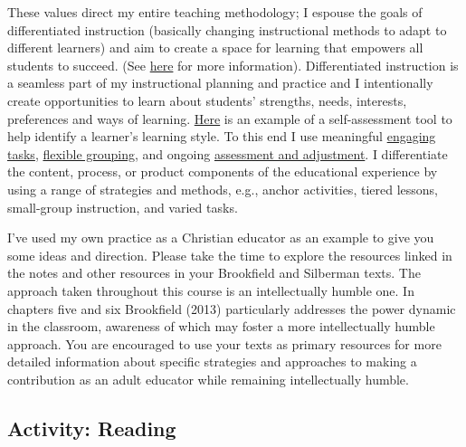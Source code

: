 \documentclass[
]{book}
\begin{document}
These values direct my entire teaching methodology; I espouse the goals of differentiated instruction (basically changing instructional methods to adapt to different learners) and aim to create a space for learning that empowers all students to succeed. (See \href{https://study.com/academy/lesson/what-is-differentiated-instruction-examples-definition-activities.html}{here} for more information). Differentiated instruction is a seamless part of my instructional planning and practice and I intentionally create opportunities to learn about students' strengths, needs, interests, preferences and ways of learning. \href{http://www.educationplanner.org/students/self-assessments/learning-styles-quiz.shtml}{Here} is an example of a self-assessment tool to help identify a learner's learning style. To this end I use meaningful \href{https://www.prolaera.com/7-effective-way-to-engage-adult-learners/}{engaging tasks}, \href{https://www.kpu.ca/sites/default/files/Teaching\%20and\%20Learning/TD.1.3_Bedford\%26Wiebe\%26Tschida_Flexible_Grouping.pdf}{flexible grouping}, and ongoing \href{https://lincs.ed.gov/state-resources/federal-initiatives/teal/guide/formativeassessment}{assessment and adjustment}. I differentiate the content, process, or product components of the educational experience by using a range of strategies and methods, e.g., anchor activities, tiered lessons, small-group instruction, and varied tasks.

I've used my own practice as a Christian educator as an example to give you some ideas and direction. Please take the time to explore the resources linked in the notes and other resources in your Brookfield and Silberman texts. The approach taken throughout this course is an intellectually humble one. In chapters five and six Brookfield (2013) particularly addresses the power dynamic in the classroom, awareness of which may foster a more intellectually humble approach. You are encouraged to use your texts as primary resources for more detailed information about specific strategies and approaches to making a contribution as an adult educator while remaining intellectually humble.

\hypertarget{activity-reading-2}{%
\subsection*{Activity: Reading}\label{activity-reading-2}}
\end{document}
